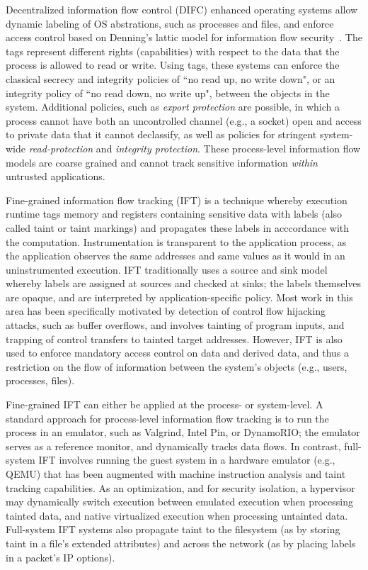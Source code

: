 Decentralized information flow control (DIFC) enhanced operating systems allow
dynamic labeling of OS abstrations, such as processes and files, and enforce
access control based on Denning's lattic model for information flow
security~\cite{}.
%
The tags represent different rights (capabilities) with respect to the data
that the process is allowed to read or write.
%
Using tags, these systems can enforce the classical secrecy and integrity policies of
``no read up, no write down", or an integrity policy of ``no read down, no
write up", between the objects in the system.
%
Additional policies, such as \emph{export protection} are possible, in which a
process cannot have both an uncontrolled channel (e.g., a socket) open and
access to private data that it cannot declassify, as well as
policies for stringent system-wide \emph{read-protection} and \emph{integrity
protection}.
%
These process-level information flow models are coarse grained and cannot track
sensitive information \emph{within} untrusted applications.


%
Fine-grained information flow tracking (IFT) is a technique whereby execution
runtime tags memory and registers containing sensitive data with labels (also
called taint or taint markings) and propagates these labels in
acccordance with the computation.
%
Instrumentation is transparent to the application process, as the application
observes the same addresses and same values as it would in an uninstrumented
execution.
%
IFT traditionally uses a source and sink model whereby labels are
assigned at sources and checked at sinks; the labels themselves are opaque,
and are interpreted by application-specific policy.
%
Most work in this area has been specifically motivated by detection of control
flow hijacking attacks, such as buffer overflows, and involves tainting of
program inputs, and trapping of control transfers to tainted target addresses.
%
However, IFT is also used to enforce mandatory access control on data and
derived data, and thus a restriction on the flow of information between
the system's objects (e.g., users, processes, files).


Fine-grained IFT can either be applied at the process- or system-level.
%
A standard approach for process-level information flow tracking is to run
the process in an emulator, such as Valgrind, Intel Pin, or DynamoRIO; the
emulator serves as a reference monitor, and dynamically tracks data flows.
%
In contrast, full-system IFT involves running the guest system in a hardware
emulator (e.g., QEMU) that has been augmented with machine instruction analysis
and taint tracking capabilities.
%
As an optimization, and for security isolation, a hypervisor may dynamically
switch execution between emulated execution when processing tainted data, and
native virtualized execution when processing untainted data.
%
Full-system IFT systems also propagate taint to the filesystem (as by storing
taint in a file's extended attributes) and across the network (as by placing
labels in a packet's IP options).


